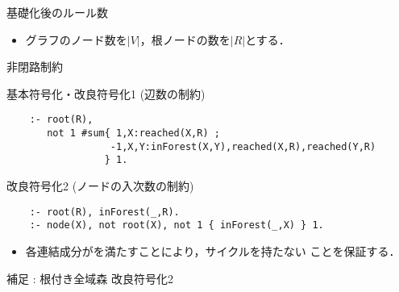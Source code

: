 \begin{frame}{基礎化後のルール数}
  \begin{itemize}
  \item グラフのノード数を$|V|$，根ノードの数を$|R|$とする．
  \end{itemize}
  \begin{table}[t]
    \centering
    
  \end{table}
\end{frame}
\begin{frame}[fragile]{非閉路制約}
\begin{minipage}[c]{1.01\textwidth}
\begin{exampleblock}{基本符号化・改良符号化1 (辺数の制約)}\small
\begin{lstlisting}
    :- root(R),
       not 1 #sum{ 1,X:reached(X,R) ;
                  -1,X,Y:inForest(X,Y),reached(X,R),reached(Y,R)
                 } 1.
\end{lstlisting}
\end{exampleblock}
\begin{exampleblock}{改良符号化2 (ノードの入次数の制約)}\small
\begin{lstlisting}
    :- root(R), inForest(_,R).
    :- node(X), not root(X), not 1 { inForest(_,X) } 1.
\end{lstlisting}
\end{exampleblock}
\end{minipage}
\vfill
\begin{itemize}
\item 各連結成分がを満たすことにより，サイクルを持たない
	  ことを保証する．
\end{itemize}
\end{frame}

\begin{frame}[fragile]{補足 : 根付き全域森 改良符号化2}

\end{frame}

